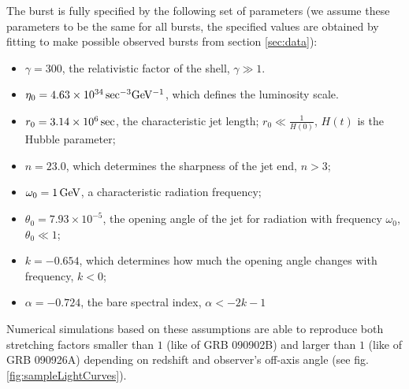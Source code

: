 \documentclass[11pt,a4paper]{article}
\begin{document}
The burst is fully specified by the following set of parameters (we assume these parameters to be the same for all bursts, the specified values are obtained by fitting to make possible observed bursts from section \ref{sec:data}):
\begin{itemize}
	\item{$\gamma = 300$, the relativistic factor of the shell, $\gamma \gg 1$.}
	\item{$\eta_0 = \unit[4.63 \times 10^{34}]{sec^{-3} GeV^{-1}}$, which defines the luminosity scale.}
	\item{$r_0 = \unit[3.14 \times 10^6]{sec}$, the characteristic jet length; $r_0 \ll \frac{1}{H\left(0\right)}$, $H\left(t\right)$ is the Hubble parameter;}
	\item{$n = 23.0$, which determines the sharpness of the jet end, $n > 3$;}
	\item{$\omega_0 = \unit[1]{GeV}$, a characteristic radiation frequency;}
	\item{$\theta_0 = 7.93 \times 10^{-5}$, the opening angle of the jet for radiation with frequency $\omega_0$, $\theta_0 \ll 1$;}
	\item{$k = -0.654$, which determines how much the opening angle changes with frequency, $k < 0$;}
	\item{$\alpha = -0.724$, the bare spectral index, $\alpha < -2k - 1$}
\end{itemize}

Numerical simulations based on these assumptions are able to reproduce both stretching factors smaller than $1$ (like of GRB 090902B) and larger than $1$ (like of GRB 090926A) depending on redshift and observer's off-axis angle (see fig. \ref{fig:sampleLightCurves}).
\end{document}

